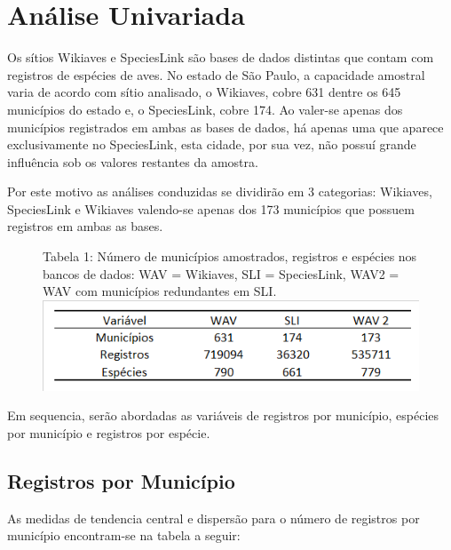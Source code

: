 \section{Análise Univariada}

\hrulefill



\hrulefill


\begin{resposta}
Os sítios Wikiaves e SpeciesLink são bases de dados distintas que contam com registros de espécies de aves. No estado de São Paulo, a capacidade amostral varia de acordo com sítio analisado, o Wikiaves, cobre 631 dentre os 645 municípios do estado e, o SpeciesLink, cobre 174. Ao valer-se apenas dos municípios registrados em ambas as bases de dados, há apenas uma que aparece exclusivamente no SpeciesLink, esta cidade, por sua vez, não possuí grande influência sob os valores restantes da amostra. 

Por este motivo as análises conduzidas se dividirão em 3 categorias: Wikiaves, SpeciesLink e Wikiaves valendo-se apenas dos 173 municípios que possuem registros em ambas as bases.

\end{resposta}

\begin{figure}[h!]
\centering
{\scriptsize Tabela 1: Número de municípios amostrados, registros e espécies nos bancos de dados: WAV = Wikiaves, SLI = SpeciesLink, WAV2 = WAV com municípios redundantes em SLI.}
\includegraphics{Imagens/T01.png}
\end{figure}

\begin{resposta}
Em sequencia, serão abordadas as variáveis de registros por município, espécies por município e registros por espécie.
\end{resposta}

\subsection{Registros por Município}

\begin{resposta}
As medidas de tendencia central e dispersão para o número de registros por município encontram-se na tabela a seguir: 
\end{resposta}

